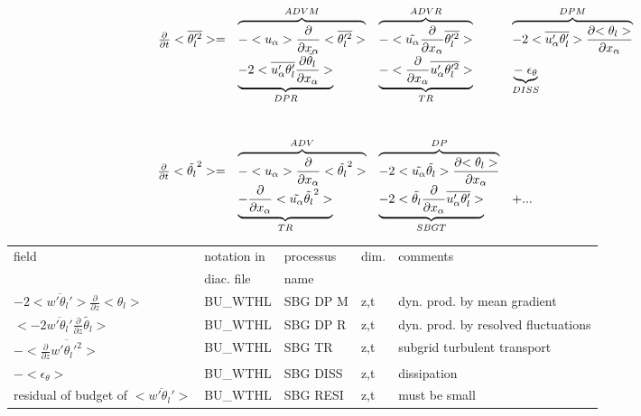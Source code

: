 \begin{displaymath}
\left.
\begin{array}{rllll}
\frac{\partial }{\partial t} <\overline{\theta_l'^2}> = & 
\overbrace{- <u_\alpha>\frac{\partial}{\partial x_\alpha} <\overline{\theta_l'^2}> }^{ADVM}  &
\overbrace{- <\tilde{u_\alpha}\frac{\partial}{\partial x_\alpha} \overline{\theta_l'^2} > }^{ADVR} &
\overbrace{- 2 <\overline{u_\alpha'\theta_l'}> \frac{\partial {<\theta_l>}}{\partial x_\alpha} }^{DPM} \\
\vspace*{1.0cm}
& \underbrace{- 2 <\overline{u'_\alpha \theta_l'} \frac{\partial {\tilde{\theta_l}}}{\partial x_\alpha}>}_{DPR}  &
 \underbrace{- <\frac{\partial}{\partial x_\alpha} \overline{u'_\alpha \theta_l'^2}>}_{TR}
 & \underbrace{-\; \epsilon_{\theta}}_{DISS}\\
\frac{\partial }{\partial t} <\tilde{\theta_l}^2> = & 
\overbrace{- <u_\alpha>\frac{\partial}{\partial x_\alpha} <\tilde{\theta_l}^2> }^{ADV} &
\overbrace{- 2<\tilde{u_\alpha} \tilde{\theta_l}> \frac{\partial {<\theta_l>}}{\partial x_\alpha}}^{DP} &\\
& \underbrace{- \frac{\partial}{\partial x_\alpha} <\tilde{u_\alpha} \tilde{\theta_l}^2>}_{TR} &
\underbrace{- 2 <\tilde{\theta_l}\frac{\partial}{\partial x_\alpha}\overline{u'_\alpha \theta_l'}>}_{SBGT} & + ...
\end{array}
\right.
\end{displaymath}

\begin{center}
\begin{tabular}{||p{5cm}|>{\centering}p{2cm}|>{\centering}p{2.5cm}|>{\centering}p{0.5cm}|p{5.5cm }||}
\hline
\hline
field & notation in & processus & dim.  & comments \\
      & diac. file & name      &            & \\
\hline
\hline
$- 2 <\overline{w'\theta_l'}>\frac{\partial }{\partial z}<\theta_l>$ & BU\_WTHL & SBG DP M & z,t & dyn. prod. by mean gradient \\
\hline
$<-2 \overline{w'\theta_l'}\frac{\partial}{\partial z}\tilde{\theta_l}>$ & BU\_WTHL & SBG DP R & z,t & dyn. prod. by resolved fluctuations\\
\hline
$-<\frac{\partial}{\partial z}\overline{w'\theta_l'^2}>$ & BU\_WTHL & SBG TR   & z,t & subgrid turbulent transport\\
\hline
$-<\epsilon_\theta>$ & BU\_WTHL & SBG DISS & z,t & dissipation \\
\hline
{\rm residual of budget of} $<\overline{w'\theta_l'}>$ & BU\_WTHL & SBG RESI & z,t & must be small \\
\hline
\hline
\end{tabular}
\end{center}

